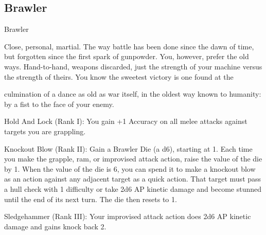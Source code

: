 \subsection{Brawler}

                                                     Brawler  

Close, personal, martial. The way battle has been done since the dawn of time, but forgotten since the first  
spark of gunpowder. You, however, prefer the old ways. Hand-to-hand, weapons discarded, just the  
strength of your machine versus the strength of theirs. You know the sweetest victory is one found at the  

culmination of a dance as old as war itself, in the oldest way known to humanity: by a fist to the face of  
your enemy.   

Hold And Lock (Rank I): You gain +1 Accuracy on all melee attacks against targets you are  
grappling.
 
Knockout Blow (Rank II): Gain a Brawler Die (a d6), starting at 1. Each time you make the  
grapple, ram, or improvised attack action, raise the value of the die by 1. When the value of the  
die is 6, you can spend it to make a knockout blow as an action against any adjacent target as a  
quick action. That target must pass a hull check with 1 difficulty or take 2d6 AP kinetic damage  
and become stunned until the end of its next turn. The die then resets to 1.
 
Sledgehammer (Rank III): Your improvised attack action does 2d6 AP kinetic damage and gains  
knock back 2.
 